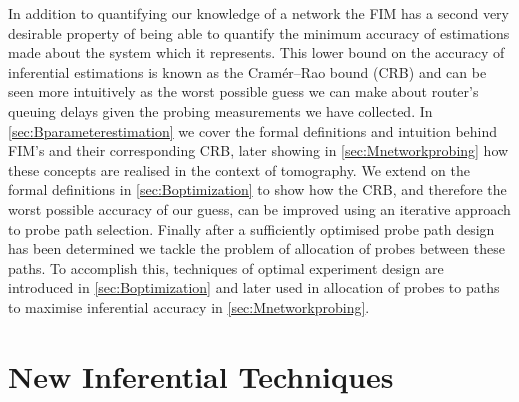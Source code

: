 In addition to quantifying our knowledge of a network the FIM has a second very desirable property of being able to quantify the minimum accuracy of estimations made about the system which it represents. This lower bound on the accuracy of inferential estimations is known as the Cramér–Rao bound (CRB) and can be seen more intuitively as the worst possible guess we can make about router's queuing delays given the probing measurements we have collected. In \cref{sec:Bparameterestimation} we cover the formal definitions and intuition behind FIM's and their corresponding CRB, later showing in \cref{sec:Mnetworkprobing} how these concepts are realised in the context of tomography. We extend on the formal definitions in \cref{sec:Boptimization} to show how the CRB, and therefore the worst possible accuracy of our guess, can be improved using an iterative approach to probe path selection. Finally after a sufficiently optimised probe path design has been determined we tackle the problem of allocation of probes between these paths. To accomplish this, techniques of optimal experiment design \cite{anthony_c_optimum_1996} are introduced in \cref{sec:Boptimization} and later used in allocation of probes to paths to maximise inferential accuracy in \cref{sec:Mnetworkprobing}.\par

\newpage
\section{New Inferential Techniques}
\label{sec:Iinferentialtechniques}

